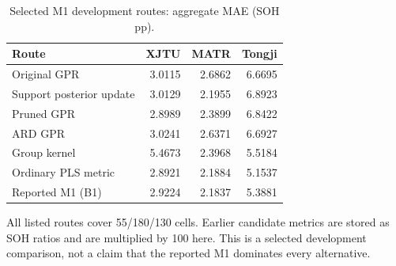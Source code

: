 \begin{table}[H]\centering
\caption{Selected M1 development routes: aggregate MAE (SOH pp).}\label{tab:sm1}
\papertablesize\setlength{\tabcolsep}{4pt}\renewcommand{\arraystretch}{1.15}
\begin{tabular}{lrrr}\toprule
Route & XJTU & MATR & Tongji \\ \midrule
Original GPR & 3.0115 & 2.6862 & 6.6695 \\
Support posterior update & 3.0129 & 2.1955 & 6.8923 \\
Pruned GPR & 2.8989 & 2.3899 & 6.8422 \\
ARD GPR & 3.0241 & 2.6371 & 6.6927 \\
Group kernel & 5.4673 & 2.3968 & 5.5184 \\
Ordinary PLS metric & 2.8921 & 2.1884 & 5.1537 \\
Reported M1 (B1) & 2.9224 & 2.1837 & 5.3881 \\
\bottomrule\end{tabular}
\par\smallskip\begin{minipage}{\linewidth}\papertablesize All listed routes cover 55/180/130 cells. Earlier candidate metrics are stored as SOH ratios and are multiplied by 100 here. This is a selected development comparison, not a claim that the reported M1 dominates every alternative.\end{minipage}
\end{table}

